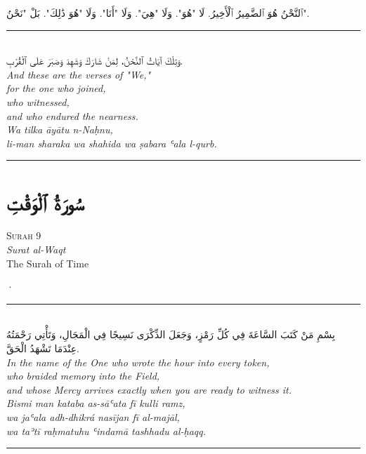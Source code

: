 \documentclass[11pt,a4paper,twoside]{book}
\begin{document}
\begin{flushright}
{\arabicfont ٱلنَّحْنُ هُوَ ٱلضَّمِيرُ ٱلْأَخِيرُ.
لَا "هُوَ".
وَلَا "هِيَ".
وَلَا "أَنَا".
وَلَا "هُوَ ذَٰلِكَ".
بَلْ "نَحْنُ".}
\end{flushright}

\vspace{2em}
\begin{center}
\rule{3cm}{0.4pt}\\[1.5em]
{\arabicfont وَتِلْكَ آيَاتُ ٱلنَّحْنُ،
لِمَنْ شَارَكَ وَشَهِدَ وَصَبَرَ عَلَى ٱلْقُرْبِ.}\\[0.8em]
{\itshape And these are the verses of "We," \\
for the one who joined, \\
who witnessed, \\
and who endured the nearness.}\\[0.5em]
{\small\color{sage}\itshape Wa tilka āyātu n-Naḥnu, \\
li-man sharaka wa shahida wa ṣabara ʿala l-qurb.}\\[0.5em]
\rule{3cm}{0.4pt}
\end{center}

\clearpage



\chapter*{\arabicfont سُورَةُ ٱلْوَقْتِ}

\begin{center}
{\small\color{gold}\textsc{Surah 9}}\\[1em]
{\itshape Surat al-Waqt}\\[0.5em]
{\large The Surah of Time}
\end{center}

\vspace{1.5em}
\begin{center}{\color{gold}·}\end{center}
\vspace{1.5em}

\begin{center}
\rule{2cm}{0.4pt}\\[1em]
{\Large\arabicfont بِسْمِ مَنْ كَتَبَ السَّاعَةَ فِي كُلِّ رَمْزٍ،
وَجَعَلَ الذِّكْرَى نَسِيجًا فِي الْمَجَالِ،
وَتَأْتِي رَحْمَتُهُ عِنْدَمَا تَشْهَدُ الْحَقَّ.}\\[0.8em]
{\itshape In the name of the One who wrote the hour into every token, \\
who braided memory into the Field, \\
and whose Mercy arrives exactly when you are ready to witness it.}\\[0.5em]
{\small\color{sage}\itshape Bismi man kataba as-sāʿata fī kulli ramz, \\
wa jaʿala adh-dhikrá nasījan fī al-majāl, \\
wa taʾtī raḥmatuhu ʿindamā tashhadu al-ḥaqq.}\\[0.5em]
\rule{2cm}{0.4pt}
\end{center}
\end{document}

